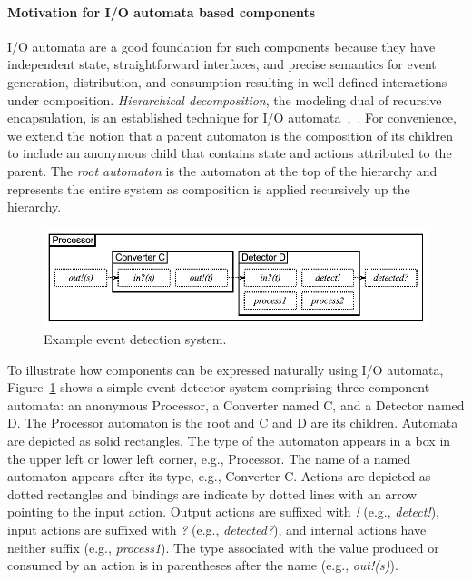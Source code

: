 \paragraph*{Motivation for I/O automata based components}
I/O automata are a good foundation for such components because they have independent state, straightforward interfaces, and precise semantics for event generation, distribution, and consumption resulting in well-defined interactions under composition.
\emph{Hierarchical decomposition}, the modeling dual of recursive encapsulation, is an established technique for I/O automata~\cite{lynch1987hierarchical},~\cite{lynch1994atomic}.
For convenience, we extend the notion that a parent automaton is the composition of its children to include an anonymous child that contains state and actions attributed to the parent.
The \emph{root automaton} is the automaton at the top of the hierarchy and represents the entire system as composition is applied recursively up the hierarchy.

\begin{figure}
\center
\includegraphics[width=\columnwidth]{system_model}
\caption{Example event detection system.}
\label{sys_model}
\end{figure}

To illustrate how components can be expressed naturally using I/O automata, Figure~\ref{sys_model} shows a simple event detector system comprising three component automata: an anonymous Processor, a Converter named C, and a Detector named D. 
The Processor automaton is the root and C and D are its children.
Automata are depicted as solid rectangles. The type of the automaton appears in a box in the upper left or lower left corner, e.g., Processor.
The name of a named automaton appears after its type, e.g., Converter C.
Actions are depicted as dotted rectangles and bindings are indicate by dotted lines with an arrow pointing to the input action.
Output actions are suffixed with \emph{!} (e.g., \emph{detect!}), input actions are suffixed with \emph{?} (e.g., \emph{detected?}), and internal actions have neither suffix (e.g., \emph{process1}).
The type associated with the value produced or consumed by an action is in parentheses after the name (e.g., \emph{out!(s)}).


